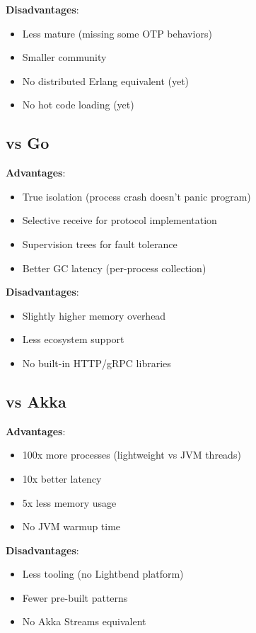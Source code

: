 \documentclass[12pt,a4paper]{report}
\begin{document}
\textbf{Disadvantages}:
\begin{itemize}
\item Less mature (missing some OTP behaviors)
\item Smaller community
\item No distributed Erlang equivalent (yet)
\item No hot code loading (yet)
\end{itemize}

\subsection{vs Go}

\textbf{Advantages}:
\begin{itemize}
\item True isolation (process crash doesn't panic program)
\item Selective receive for protocol implementation
\item Supervision trees for fault tolerance
\item Better GC latency (per-process collection)
\end{itemize}

\textbf{Disadvantages}:
\begin{itemize}
\item Slightly higher memory overhead
\item Less ecosystem support
\item No built-in HTTP/gRPC libraries
\end{itemize}

\subsection{vs Akka}

\textbf{Advantages}:
\begin{itemize}
\item 100x more processes (lightweight vs JVM threads)
\item 10x better latency
\item 5x less memory usage
\item No JVM warmup time
\end{itemize}

\textbf{Disadvantages}:
\begin{itemize}
\item Less tooling (no Lightbend platform)
\item Fewer pre-built patterns
\item No Akka Streams equivalent
\end{itemize}
\end{document}
